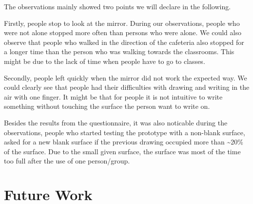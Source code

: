 \documentclass{sigchi-ext}
\begin{document}
The observations mainly showed two points we will declare in the following. 

 Firstly, people stop to look at the mirror. During our observations, people who were not alone stopped more often than persons who were alone. We could also observe that people who walked in the direction of the cafeteria also stopped for a longer time than the person who was walking towards the classrooms. This might be due to the lack of time when people have to go to classes.

Secondly, people left quickly when the mirror did not work the expected way. We could clearly see that people had their difficulties with drawing and writing in the air with one finger. It might be that for people it is not intuitive to write something without touching the surface the person want to write on.

Besides the results from the questionnaire, it was also noticable during the observations, people who started testing the prototype with a non-blank surface, asked for a new blank surface if the previous drawing occupied more than \textasciitilde20\% of the surface. Due to the small given surface, the surface was most of the time too full after the use of one person/group.

\section{Future Work}

\end{document}
